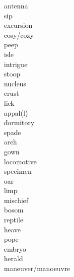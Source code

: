 \documentclass[b5paper, 11pt]{ctexart}
\begin{document}
\begin{multicols*}{3}
\begin{description}
\item[antenna]

\item[sip]

\item[excursion]

\item[cosy/cozy]

\item[peep]

\item[isle]

\item[intrigue]

\item[stoop]

\item[nucleus]

\item[crust]

\item[lick]

\item[appal(l)]

\item[dormitory]

\item[spade]

\item[arch]

\item[gown]

\item[locomotive]

\item[specimen]

\item[oar]

\item[limp]

\item[mischief]

\item[bosom]

\item[reptile]

\item[heave]

\item[pope]

\item[embryo]

\item[herald]

\item[maneuver/manoeuvre]


\end{description}
\end{multicols*}
\end{document}
